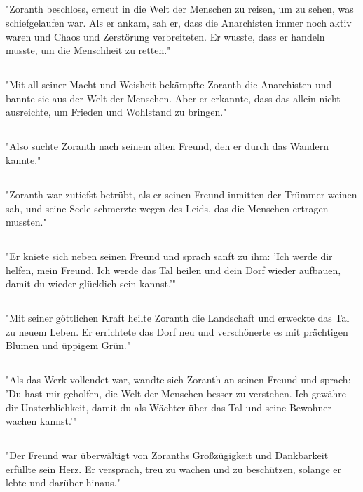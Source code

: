 \documentclass{article}
\begin{document}
\subsection{}
"Zoranth beschloss, erneut in die Welt der Menschen zu reisen, um zu sehen, was schiefgelaufen war. Als er ankam, sah er, dass die Anarchisten immer noch aktiv waren und Chaos und Zerstörung verbreiteten. Er wusste, dass er handeln musste, um die Menschheit zu retten."
\subsection{}
"Mit all seiner Macht und Weisheit bekämpfte Zoranth die Anarchisten und bannte sie aus der Welt der Menschen. Aber er erkannte, dass das allein nicht ausreichte, um Frieden und Wohlstand zu bringen."
\subsection{}
"Also suchte Zoranth nach seinem alten Freund, den er durch das Wandern kannte."
\subsection{}
"Zoranth war zutiefst betrübt, als er seinen Freund inmitten der Trümmer weinen sah, und seine Seele schmerzte wegen des Leids, das die Menschen ertragen mussten."
\subsection{}
"Er kniete sich neben seinen Freund und sprach sanft zu ihm: 'Ich werde dir helfen, mein Freund. Ich werde das Tal heilen und dein Dorf wieder aufbauen, damit du wieder glücklich sein kannst.'"
\subsection{}
"Mit seiner göttlichen Kraft heilte Zoranth die Landschaft und erweckte das Tal zu neuem Leben. Er errichtete das Dorf neu und verschönerte es mit prächtigen Blumen und üppigem Grün."
\subsection{}
"Als das Werk vollendet war, wandte sich Zoranth an seinen Freund und sprach: 'Du hast mir geholfen, die Welt der Menschen besser zu verstehen. Ich gewähre dir Unsterblichkeit, damit du als Wächter über das Tal und seine Bewohner wachen kannst.'"
\subsection{}
"Der Freund war überwältigt von Zoranths Großzügigkeit und Dankbarkeit erfüllte sein Herz. Er versprach, treu zu wachen und zu beschützen, solange er lebte und darüber hinaus."
\end{document}
